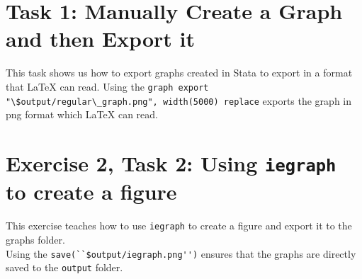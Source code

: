 \documentclass[]{article}
\begin{document}
\section*{Task 1: Manually Create a Graph and then Export it}

This task shows us how to export graphs created in Stata to export in a format that {\LaTeX} can read. Using the \verb|graph export "\$output/regular\_graph.png", width(5000) replace| 
exports the graph in png format which {\LaTeX} can read. 
\section*{Exercise 2, Task 2: Using \texttt{iegraph} to create a figure}

This exercise teaches how to use \texttt{iegraph} to create a figure and export it to the graphs folder. \\

Using the \verb|save(``$output/iegraph.png'')| ensures that the graphs are directly saved to the \texttt{output} folder. 

\section*{}
	
\end{document}
